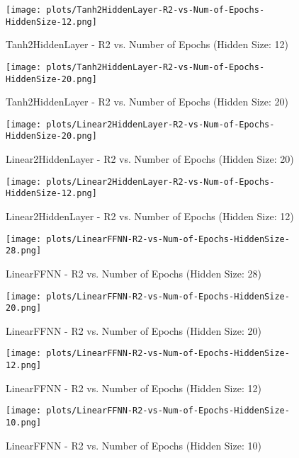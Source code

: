 \begin{figure}[H]
    \centering
    \texttt{[image: plots/Tanh2HiddenLayer-R2-vs-Num-of-Epochs-HiddenSize-12.png]}
    \caption{Tanh2HiddenLayer - R2 vs. Number of Epochs (Hidden Size: 12)}
\end{figure}

\begin{figure}[H]
    \centering
    \texttt{[image: plots/Tanh2HiddenLayer-R2-vs-Num-of-Epochs-HiddenSize-20.png]}
    \caption{Tanh2HiddenLayer - R2 vs. Number of Epochs (Hidden Size: 20)}
\end{figure}

\begin{figure}[H]
    \centering
    \texttt{[image: plots/Linear2HiddenLayer-R2-vs-Num-of-Epochs-HiddenSize-20.png]}
    \caption{Linear2HiddenLayer - R2 vs. Number of Epochs (Hidden Size: 20)}
\end{figure}

\begin{figure}[H]
    \centering
    \texttt{[image: plots/Linear2HiddenLayer-R2-vs-Num-of-Epochs-HiddenSize-12.png]}
    \caption{Linear2HiddenLayer - R2 vs. Number of Epochs (Hidden Size: 12)}
\end{figure}

\begin{figure}[H]
    \centering
    \texttt{[image: plots/LinearFFNN-R2-vs-Num-of-Epochs-HiddenSize-28.png]}
    \caption{LinearFFNN - R2 vs. Number of Epochs (Hidden Size: 28)}
\end{figure}

\begin{figure}[H]
    \centering
    \texttt{[image: plots/LinearFFNN-R2-vs-Num-of-Epochs-HiddenSize-20.png]}
    \caption{LinearFFNN - R2 vs. Number of Epochs (Hidden Size: 20)}
\end{figure}

\begin{figure}[H]
    \centering
    \texttt{[image: plots/LinearFFNN-R2-vs-Num-of-Epochs-HiddenSize-12.png]}
    \caption{LinearFFNN - R2 vs. Number of Epochs (Hidden Size: 12)}
\end{figure}

\begin{figure}[H]
    \centering
    \texttt{[image: plots/LinearFFNN-R2-vs-Num-of-Epochs-HiddenSize-10.png]}
    \caption{LinearFFNN - R2 vs. Number of Epochs (Hidden Size: 10)}
\end{figure}

